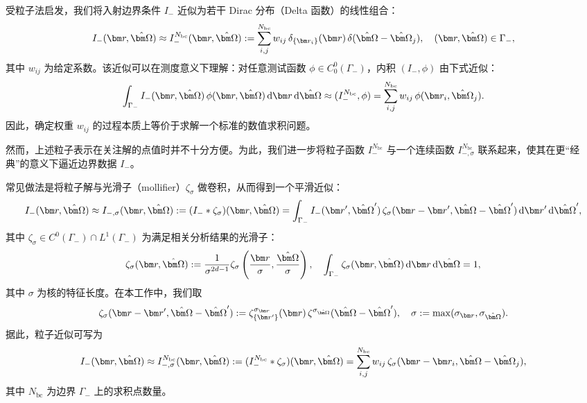 受粒子法启发，我们将入射边界条件 $I_-$ 近似为若干 Dirac 分布（Delta 函数）的线性组合：
\begin{equation}
    I_{-}(\br, \bOmega) \approx I_{-}^{N_\text{bc}}(\br,\bOmega):=\sum_{i,j}^{N_\text{bc}} w_{ij}\,\delta_{\{\br_i\}}(\br)\,\delta(\bOmega-\bOmega_j), \quad (\br,\bOmega) \in \Gamma_{-},
\end{equation}
其中 $w_{ij}$ 为给定系数。该近似可以在测度意义下理解：对任意测试函数 $\phi\in C^0_0(\Gamma_-)$，内积 $(I_{-},\phi)$ 由下式近似：
\begin{equation}
    \int_{\Gamma_{-}} I_{-}(\br,\bOmega)\,\phi (\br,\bOmega) \,\mathrm{d}{\br} \,\mathrm{d}{\bOmega} \approx (I_{-}^{N_\text{bc}},\phi) = \sum_{i,j}^{N_\text{bc}} w_{ij}\,\phi(\br_i,\bOmega_j).
\end{equation}
因此，确定权重 $w_{ij}$ 的过程本质上等价于求解一个标准的数值求积问题。

然而，上述粒子表示在关注解的点值时并不十分方便。为此，我们进一步将粒子函数 $I_{-}^{N_\text{bc}}$ 与一个连续函数 $I_{-,\sigma}^{N_\text{bc}}$ 联系起来，使其在更“经典”的意义下逼近边界数据 $I_{-}$。

常见做法是将粒子解与光滑子（mollifier）$\zeta_\sigma$ 做卷积，从而得到一个平滑近似：
\begin{equation}
    I_{-}(\br, \bOmega) \approx I_{-,\sigma}(\br,\bOmega)
    := (I_-*\zeta_\sigma)(\br, \bOmega)
    = \int_{\Gamma_-} I_-(\br', \bOmega')\, \zeta_\sigma(\br-\br', \bOmega - \bOmega') \,\mathrm{d}{\br'}\,\mathrm{d}{\bOmega'},
\end{equation}
其中 $\zeta_\sigma \in C^0(\Gamma_-)\cap L^1(\Gamma_-) $ 为满足相关分析结果的光滑子：
\begin{equation}
    \zeta_\sigma(\br, \bOmega):=\frac{1}{\sigma^{2d-1}}\zeta_{\sigma}\left(\frac{\br}{\sigma}, \frac{\bOmega}{\sigma}\right), \quad  \int_{\Gamma_{-}} \zeta_\sigma(\br,\bOmega) \,\mathrm{d}{\br} \,\mathrm{d}{\bOmega} = 1,
\end{equation}
其中 $\sigma$ 为核的特征长度。在本工作中，我们取
\begin{equation}
    \zeta_\sigma(\br-\br', \bOmega-\bOmega') := \zeta^{\sigma_{\br}}_{\{\br'\}}(\br)\,\zeta^{\sigma_{\bOmega}}(\bOmega-\bOmega'), \quad \sigma:=\max(\sigma_{\br},\sigma_{\bOmega}).
\end{equation}
据此，粒子近似可写为
\begin{equation}\label{eq:particle-approx}
    I_-(\br, \bOmega) \approx
    I^{N_{\text{bc}}}_{-,\sigma}(\br,\bOmega)
    := (I_-^{N_\text{bc}}*\zeta_\sigma)(\br, \bOmega)
    = \sum_{i,j}^{N_\text{bc}} w_{ij}\,\zeta_\sigma(\br-\br_i,\bOmega-\bOmega_j),
\end{equation}
其中 $N_{\text{bc}}$ 为边界 $\Gamma_-$ 上的求积点数量。

